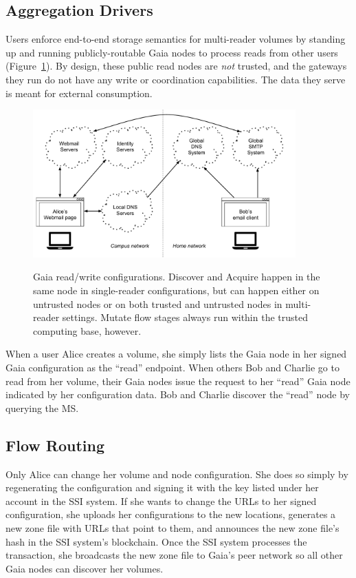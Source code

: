\subsection{Aggregation Drivers}

Users enforce end-to-end storage semantics for multi-reader volumes by standing up and running
publicly-routable Gaia nodes to process reads from other users
(Figure~\ref{fig:chap3-gaia-reads-writes}).  By design,
these public read nodes are \emph{not} trusted, and the gateways they run do not
have any write or coordination capabilities.  The data they serve is
meant for external consumption.

\begin{figure}[h]
   \caption{Gaia read/write configurations.  Discover and Acquire happen in the
   same node in single-reader configurations, but can happen either on untrusted
   nodes or on both trusted and untrusted nodes in multi-reader settings.
   Mutate flow stages always run within the trusted computing base, however.}
   \centering
   \includegraphics[width=0.9\textwidth,page=19]{figures/dissertation-figures}
   \label{fig:chap3-gaia-reads-writes}
\end{figure}

When a user Alice creates a volume, she simply lists the Gaia node
in her signed Gaia configuration as the ``read'' endpoint.  When others Bob and Charlie go to
read from her volume, their Gaia nodes issue the request to her ``read'' Gaia node
indicated by her configuration data.  Bob and Charlie discover the ``read'' node 
by querying the MS.

\subsection{Flow Routing}

Only Alice can change her volume and node configuration.  She does so simply by
regenerating the configuration and signing it with the key listed under her
account in the SSI system.  If she wants to change the URLs to her signed
configuration, she uploads her configurations to the new locations, generates a
new zone file with URLs that point to them, and announces the new zone file's
hash in the SSI system's blockchain.  Once the SSI system processes the
transaction, she broadcasts the new zone file to Gaia's peer network so all
other Gaia nodes can discover her volumes.

